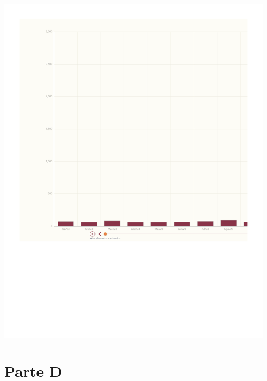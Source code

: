 \documentclass[
  letterpaper,
  DIV=11,
  numbers=noendperiod]{scrreprt}
\begin{document}
\includegraphics{2023_files/figure-pdf/unnamed-chunk-4-1.pdf}

\section{Parte D}
\end{document}
